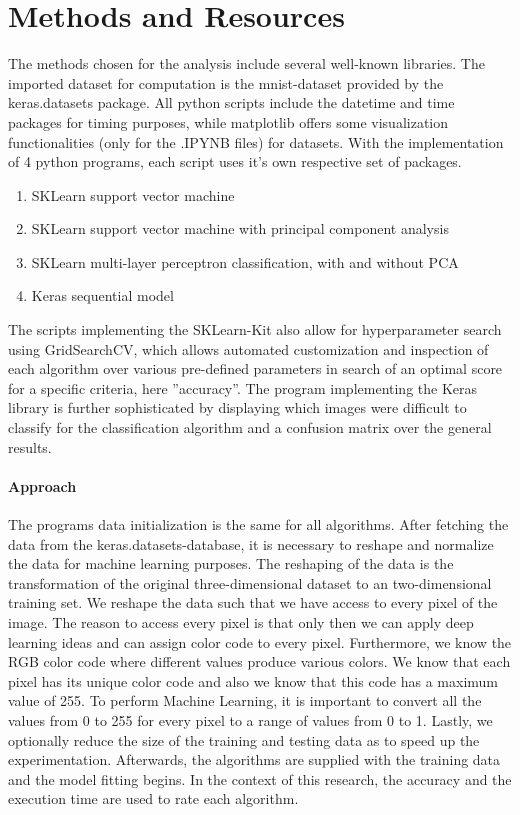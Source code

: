 \chapter{Methods and Resources}
The methods chosen for the analysis include several well-known libraries.
The imported dataset for computation is the mnist-dataset provided by the keras.datasets package.
All python scripts include the datetime and time packages for timing purposes, while matplotlib offers some visualization functionalities (only for the .IPYNB files) for datasets.
With the implementation of 4 python programs, each script uses it's own respective set of packages.
\begin{enumerate}
    \item SKLearn support vector machine
    \item SKLearn support vector machine with principal component analysis
    \item SKLearn multi-layer perceptron classification, with and without PCA
    \item Keras sequential model
\end{enumerate}

The scripts implementing the SKLearn-Kit also allow for hyperparameter search using GridSearchCV, which allows automated customization and inspection of each algorithm over various pre-defined parameters in search of an optimal score for a specific criteria, here ''accuracy''.
The program implementing the Keras library is further sophisticated by displaying which images were difficult to classify for the classification algorithm and a confusion matrix over the general results.

\subsubsection{Approach}
The programs data initialization is the same for all algorithms. After fetching the data from the keras.datasets-database, it is necessary to reshape and normalize the data for machine learning purposes.
The reshaping of the data is the transformation of the original three-dimensional dataset to an two-dimensional training set.
We reshape the data such that we have access to every pixel of the image. The reason to access every pixel is that only then we can apply deep learning ideas and can assign color code to every pixel.
Furthermore, we know the RGB color code where different values produce various colors. We know that each pixel has its unique color code and also we know that this code has a maximum value of 255. 
To perform Machine Learning, it is important to convert all the values from 0 to 255 for every pixel to a range of values from 0 to 1.
Lastly, we optionally reduce the size of the training and testing data as to speed up the experimentation.
Afterwards, the algorithms are supplied with the training data and the model fitting begins. In the context of this research, the accuracy and the execution time are used to rate each algorithm.
